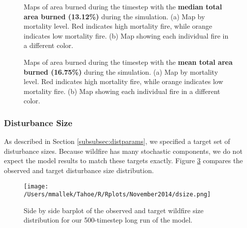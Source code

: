 \begin{figure}[!htbp]
  \centering
  \caption{Maps of area burned during the timestep with the \textbf{median total area burned (13.12\%)} during the simulation. (a) Map by mortality level. Red indicates high mortality fire, while orange indicates low mortality fire. (b) Map showing each individual fire in a different color.}
  \label{fig:darea_median_map}
\end{figure}

\begin{figure}[!htbp]
  \centering
  \caption{Maps of area burned during the timestep with the \textbf{mean total area burned (16.75\%)} during the simulation. (a) Map by mortality level. Red indicates high mortality fire, while orange indicates low mortality fire. (b) Map showing each individual fire in a different color.}
  \label{fig:darea_mean_map}
\end{figure}

\subsubsection{Disturbance Size}
As described in Section \ref{subsubsec:distparams}, we specified a target set of disturbance sizes. Because wildfire has many stochastic components, we do not expect the model results to match these targets exactly. Figure \ref{fig:dsize} compares the observed and target disturbance size distribution.



\begin{figure}[!htbp]
\centering
\texttt{[image: /Users/mmallek/Tahoe/R/Rplots/November2014/dsize.png]}
\caption{Side by side barplot of the observed and target wildfire size distribution for our 500-timestep long run of the model.}
\label{fig:dsize}
\end{figure}



